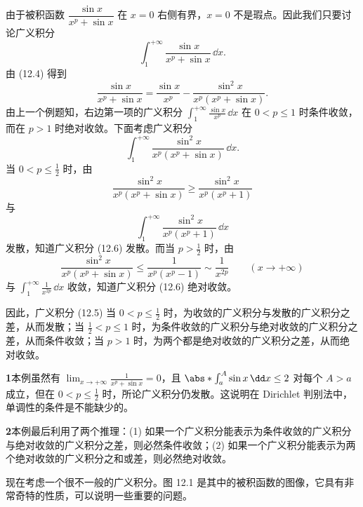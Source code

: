 \begin{xsolution}
由于被积函数 $\dfrac{\sin x}{x^p+\sin x}$ 在 $x=0$ 右侧有界，$x=0$ 不是瑕点。因此我们只要讨论广义积分
\begin{equation}
  \int_1^{+\infty}\frac{\sin x}{x^p+\sin x}\,\dd x.
  \tag{12.5}
  \label{eq:12.5}
\end{equation}
由 (12.4) 得到
\[
  \frac{\sin x}{x^p+\sin x}
  =\frac{\sin x}{x^p}-\frac{\sin^2x}{x^p(x^p+\sin x)}.
\]
由上一个例题知，右边第一项的广义积分 $\int_1^{+\infty}\frac{\sin x}{x^p}\,\dd x$ 在 $0<p\leq1$ 时条件收敛，而在 $p>1$ 时绝对收敛。下面考虑广义积分
\begin{equation}
  \int_1^{+\infty}\frac{\sin^2x}{x^p(x^p+\sin x)}\,\dd x.
  \tag{12.6}
  \label{eq:12.6}
\end{equation}
当 $0<p\leq\frac12$ 时，由
\[
  \frac{\sin^2x}{x^p(x^p+\sin x)}\geq\frac{\sin^2x}{x^p(x^p+1)}
\]
与
\[
  \int_1^{+\infty}\frac{\sin^2x}{x^p(x^p+1)}\,\dd x
\]
发散，知道广义积分 (12.6) 发散。而当 $p>\frac12$ 时，由
\[
  \frac{\sin^2x}{x^p(x^p+\sin x)}\leq\frac1{x^p(x^p-1)}\sim\frac1{x^{2p}}\qquad(x\to+\infty)
\]
与 $\int_1^{+\infty}\frac1{x^{2p}}\,\dd x$ 收敛，知道广义积分 (12.6) 绝对收敛。

因此，广义积分 (12.5) 当 $0<p\leq\frac12$ 时，为收敛的广义积分与发散的广义积分之差，从而发散；当 $\frac12<p\leq1$ 时，为条件收敛的广义积分与绝对收敛的广义积分之差，从而条件收敛；当 $p>1$ 时，为两个都是绝对收敛的广义积分之差，从而绝对收敛。
\end{xsolution}

\begin{xremark}
\textbf{1}\quad 本例虽然有 $\lim_{x\to+\infty}\frac1{x^p+\sin x}=0$，且 $\abs*{\int_a^A\sin x\,\dd x}\leq2$ 对每个 $A>a$ 成立，但在 $0<p\leq\frac12$ 时，所论广义积分仍发散。这说明在 Dirichlet 判别法中，单调性的条件是不能缺少的。
\end{xremark}

\begin{xremark}
\textbf{2}\quad 本例最后利用了两个推理：(1) 如果一个广义积分能表示为条件收敛的广义积分与绝对收敛的广义积分之差，则必然条件收敛；(2) 如果一个广义积分能表示为两个绝对收敛的广义积分之和或差，则必然绝对收敛。
\end{xremark}

现在考虑一个很不一般的广义积分。图 12.1 是其中的被积函数的图像，它具有非常奇特的性质，可以说明一些重要的问题。

